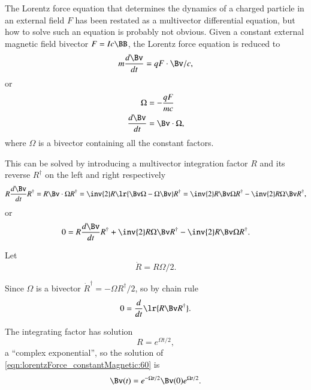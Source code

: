 %
%

The Lorentz force equation that determines the dynamics of a charged particle in an external field \( F \) has been restated as a multivector differential equation, but how to solve such an equation is probably not obvious.
Given a constant external magnetic field bivector \( F = I c \BB \), the Lorentz force equation is reduced to
\begin{dmath}\label{eqn:lorentzForce_constantMagnetic:60}
m \frac{d\Bv}{dt} = q F \cdot \Bv/c,
\end{dmath}
or
\begin{dmath}\label{eqn:lorentzForce_constantMagnetic:80}
\begin{aligned}
\Omega &= -\frac{q F}{m c} \\
\frac{d\Bv}{dt} &= \Bv \cdot \Omega,
\end{aligned}
\end{dmath}
where \( \Omega \) is a bivector containing all the constant factors.

This can be solved by introducing a multivector integration factor \( R \) and its reverse \( R^\dagger \) on the left and right respectively
\begin{dmath}\label{eqn:lorentzForce_constantMagnetic:100}
R \frac{d\Bv}{dt} R^\dagger
= R \Bv \cdot \Omega R^\dagger
= \inv{2} R \lr{ \Bv \Omega - \Omega \Bv} R^\dagger
= \inv{2} R \Bv \Omega R^\dagger - \inv{2} R \Omega \Bv R^\dagger,
\end{dmath}
or
\begin{dmath}\label{eqn:lorentzForce_constantMagnetic:120}
0 =
R \frac{d\Bv}{dt} R^\dagger
+ \inv{2} R \Omega \Bv R^\dagger
- \inv{2} R \Bv \Omega R^\dagger.
\end{dmath}

Let
\begin{dmath}\label{eqn:lorentzForce_constantMagnetic:140}
\dot{R} = R \Omega/2.
\end{dmath}

Since \( \Omega \) is a bivector \( \dot{R}^\dagger = -\Omega R^\dagger/2 \), so by chain rule
\begin{dmath}\label{eqn:lorentzForce_constantMagnetic:160}
0
=
\frac{d}{dt} \lr{
R \Bv R^\dagger
}.
\end{dmath}

The integrating factor has solution
\begin{dmath}\label{eqn:lorentzForce_constantMagnetic:180}
R = e^{\Omega t/2},
\end{dmath}
a ``complex exponential'', so the solution of \cref{eqn:lorentzForce_constantMagnetic:60} is
\begin{dmath}\label{eqn:lorentzForce_constantMagnetic:200}
\Bv(t) = e^{-\Omega t/2} \Bv(0) e^{\Omega t/2}.
\end{dmath}

